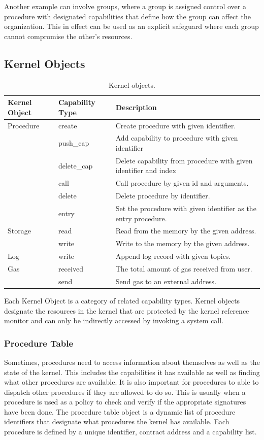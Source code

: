 \documentclass[english,a4paper]{article}
\let\oldparagraph\subsubsection
\renewcommand{\subsubsection}[1]{\oldparagraph{#1}\mbox{}}
\begin{document}
Another example can involve groups, where a group is assigned control over
a procedure with designated capabilities that define how the group can
affect the organization. This in effect can be used as an explicit
safeguard where each group cannot compromise the other's resources.

\subsection{Kernel Objects}\label{kernel-objects}
\begin{table}[H]
    \caption{Kernel objects.}
    \centering{}%
    \begin{tabular}{l|l|p{}}


        \hline
        Kernel Object & Capability Type & Description\tabularnewline
        \hline
        \hline
        Procedure & create & Create procedure with given
        identifier.\tabularnewline
        & push\_cap & Add capability to procedure with given
        identifier\tabularnewline
        & delete\_cap & Delete capability from procedure with given identifier
        and index\tabularnewline
        & call & Call procedure by given id and arguments.\tabularnewline
        & delete & Delete procedure by identifier.\tabularnewline
        & entry & Set the procedure with given identifier as the entry
        procedure.\tabularnewline
        \hline
        Storage & read & Read from the memory by the given
        address.\tabularnewline
        & write & Write to the memory by the given address.\tabularnewline
        \hline
        Log & write & Append log record with given topics.\tabularnewline
        \hline
        Gas & received & The total amount of gas received from
        user.\tabularnewline
        & send & Send gas to an external address.\tabularnewline
        \hline
    \end{tabular}
\end{table}

Each Kernel Object is a category of related capability types. Kernel
objects designate the resources in the kernel that are protected by the
kernel reference monitor and can only be indirectly accessed by invoking
a system call.

\subsubsection{Procedure Table}\label{procedure-table}
Sometimes, procedures need to access information about themselves as
well as the state of the kernel. This includes the capabilities it has
available as well as finding what other procedures are available. It is
also important for procedures to able to dispatch other procedures if
they are allowed to do so. This is usually when a procedure is used as a
policy to check and verify if the appropriate signatures have been done.
The procedure table object is a dynamic list of procedure identifiers
that designate what procedures the kernel has available. Each procedure
is defined by a unique identifier, contract address and a capability
list.
\end{document}
